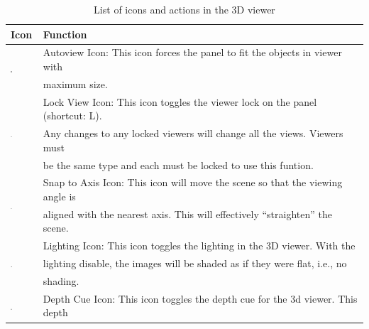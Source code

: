 \documentclass[fleqn,11pt,openany]{book}
\begin{document}
\begin{table}[h!]
\label{tab:3dicons}
\caption{List of icons and actions in the 3D viewer}
\begin{tabular}{|l|l|}
\hline
{\bf Icon} & {\bf Function}\\
\hline
\multirow{2}{*}{ \includegraphics[width=0.05\textwidth]{Seg3DBasicFunctionality_figures/AutoViewOff.png} }
& Autoview Icon: This icon forces the panel to fit the objects in viewer with \\
& maximum size.\\
\hline
\multirow{3}{*}{ \includegraphics[width=0.05\textwidth]{Seg3DBasicFunctionality_figures/LockOff.png} }
& Lock View Icon: This icon toggles the viewer lock on the panel (shortcut: L). \\ 
& Any changes to any locked viewers will change all the views.  Viewers must \\
& be the same type and each must be locked to use this funtion.\\
\hline
\multirow{2}{*}{ \includegraphics[width=0.05\textwidth]{Seg3DBasicFunctionality_figures/AlignOff.png} }
& Snap to Axis Icon: This icon will move the scene so that the viewing angle is \\
& aligned with the nearest axis.  This will effectively ``straighten'' the scene.\\
\hline
\multirow{3}{*}{ \includegraphics[width=0.05\textwidth]{Seg3DBasicFunctionality_figures/LightOff.png} }
& Lighting Icon: This icon toggles the lighting in the 3D viewer.  With the \\
& lighting disable, the images will be shaded as if they were flat, i.e., no \\
& shading.\\
\hline
\multirow{3}{*}{ \includegraphics[width=0.05\textwidth]{Seg3DBasicFunctionality_figures/FogOff.png} }
& Depth Cue Icon: This icon toggles the depth cue for the 3d viewer.  This depth\\

\end{tabular}
\end{table}
\end{document}
